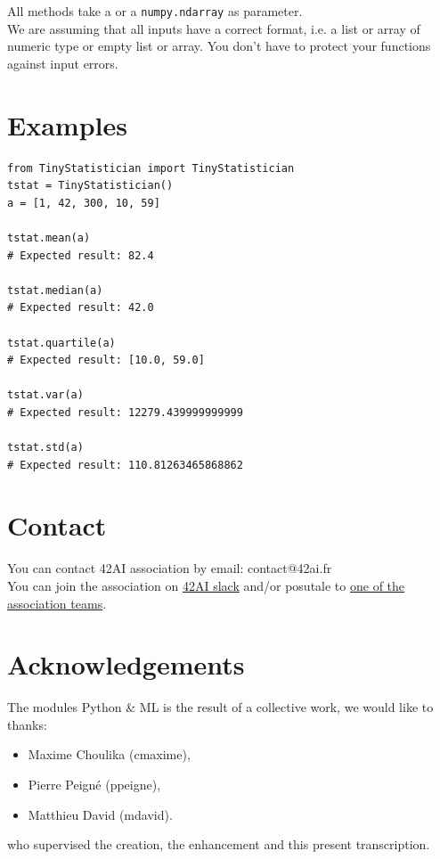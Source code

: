 \documentclass{42-en}
\begin{document}
All methods take a  or a \texttt{numpy.ndarray} as parameter.\\
We are assuming that all inputs have a correct format, i.e. a list or array of numeric type or empty list or array.
You don't have to protect your functions against input errors.


\section*{Examples}
\begin{verbatim}
from TinyStatistician import TinyStatistician
tstat = TinyStatistician()
a = [1, 42, 300, 10, 59]

tstat.mean(a)
# Expected result: 82.4

tstat.median(a)
# Expected result: 42.0

tstat.quartile(a)
# Expected result: [10.0, 59.0]

tstat.var(a)
# Expected result: 12279.439999999999

tstat.std(a)
# Expected result: 110.81263465868862  
\end{verbatim}




\newpage

\section*{Contact}
You can contact 42AI association by email: contact@42ai.fr\\
You can join the association on \href{https://join.slack.com/t/42-ai/shared_invite/zt-ebccw5r7-YPkDM6xOiYRPjqJXkrKgcA}{42AI slack}
and/or posutale to \href{https://forms.gle/VAFuREWaLmaqZw2D8}{one of the association teams}.

\section*{Acknowledgements}
The modules Python \& ML is the result of a collective work, we would like to thanks:
\begin{itemize}
  \item Maxime Choulika (cmaxime),
  \item Pierre Peigné (ppeigne),
  \item Matthieu David (mdavid).
\end{itemize}
who supervised the creation, the enhancement and this present transcription.
\end{document}
